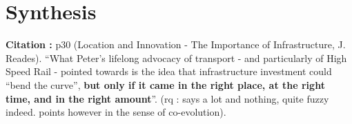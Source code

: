 \section{Synthesis}


\textbf{Citation : } p30 (Location and Innovation - The Importance of Infrastructure, J. Reades). ``What Peter's lifelong advocacy of transport - and particularly of High Speed Rail - pointed towards is the idea that infrastructure investment could ``bend the curve'', \textbf{but only if it came in the right place, at the right time, and in the right amount}''. (rq : says a lot and nothing, quite fuzzy indeed. points however in the sense of co-evolution).















